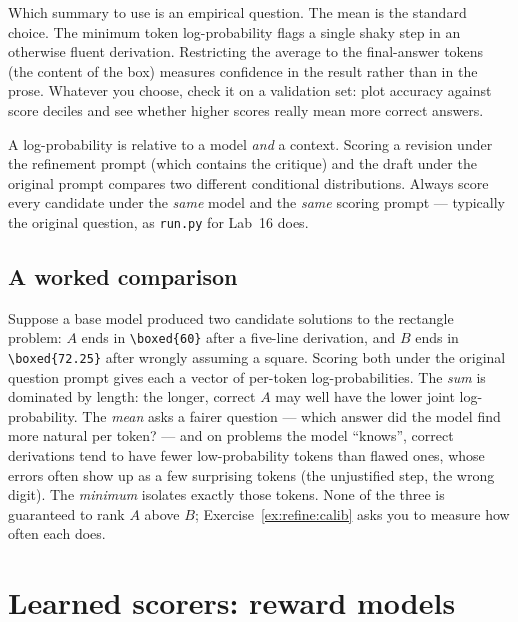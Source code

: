Which summary to use is an empirical question. The mean is the standard choice. The minimum token
log-probability flags a single shaky step in an otherwise fluent derivation. Restricting the average
to the final-answer tokens (the content of the box) measures confidence in the result rather than in
the prose. Whatever you choose, check it on a validation set: plot accuracy against score deciles and
see whether higher scores really mean more correct answers.

\begin{pitfall}
A log-probability is relative to a model \emph{and} a context. Scoring a revision under the
refinement prompt (which contains the critique) and the draft under the original prompt compares
two different conditional distributions. Always score every candidate under the \emph{same} model
and the \emph{same} scoring prompt --- typically the original question, as \texttt{run.py} for Lab~16
does.
\end{pitfall}


\subsection{A worked comparison}
Suppose a base model produced two candidate solutions to the rectangle problem: $A$ ends in
\texttt{\textbackslash boxed\{60\}} after a five-line derivation, and $B$ ends in
\texttt{\textbackslash boxed\{72.25\}} after wrongly assuming a square. Scoring both under the original
question prompt gives each a vector of per-token log-probabilities. The \emph{sum} is dominated by
length: the longer, correct $A$ may well have the lower joint log-probability. The \emph{mean} asks a
fairer question --- which answer did the model find more natural per token? --- and on problems the
model ``knows'', correct derivations tend to have fewer low-probability tokens than flawed ones,
whose errors often show up as a few surprising tokens (the unjustified step, the wrong digit). The
\emph{minimum} isolates exactly those tokens. None of the three is guaranteed to rank $A$ above $B$;
Exercise~\ref{ex:refine:calib} asks you to measure how often each does.

\section{Learned scorers: reward models}\label{sec:refine:rm}

